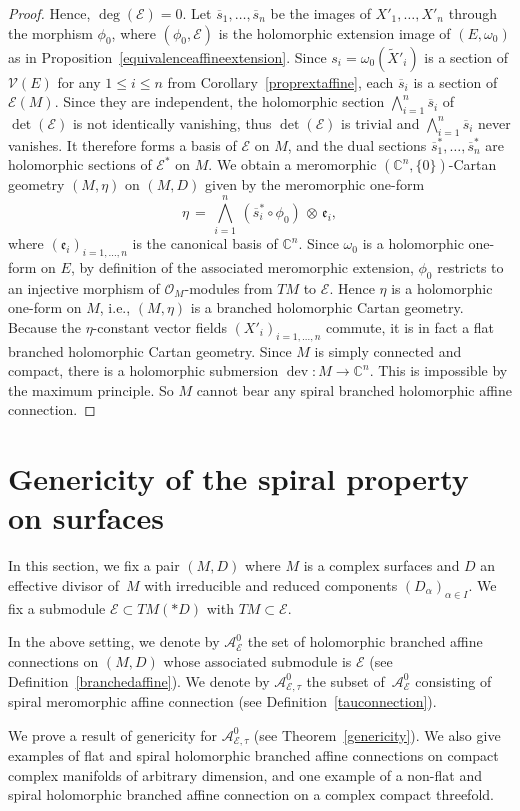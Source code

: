 \documentclass[pdftex]{sigma}
\numberwithin{equation}{section}
\begin{document}
\begin{proof}
Hence, $\deg (\mathcal{E})=0$. Let $\overline{s}_1,\dots,\overline{s}_n$ be the images of $X'_1,\dots,X'_n$ through the morphism $\phi_0$, where $(\phi_0,\mathcal{E})$ is the holomorphic extension image of $(E,\omega_0)$ as in Proposition~\ref{equivalenceaffineextension}. Since $s_i=\omega_0(\tilde{X}'_i)$ is a section of $\mathcal{V}(E)$ for any $1\leq i \leq n$ from Corollary~\ref{proprextaffine}, each $\overline{s}_i$ is a section of~$\mathcal{E}(M)$. Since they are independent, the holomorphic section $\bigwedge_{i=1}^{n} \overline{s}_i$ of $\det(\mathcal{E})$ is not identically vanishing, thus $\det(\mathcal{E})$ is trivial and $\bigwedge_{i=1}^{n}\overline{s}_i$ never vanishes. It therefore forms a basis of $\mathcal{E}$ on $M$, and the dual sections $\overline{s}_1^*,\dots,\overline{s}_n^*$ are holomorphic sections of $\mathcal{E}^*$ on $M$. We obtain a meromorphic $(\mathbb{C}^n,\{0\})$-Cartan geometry $(M,\eta)$ on $(M,D)$ given by the meromorphic one-form
\[ \eta \,=\, \bigwedge_{i=1}^{n} \,(\overline{s}_i^* \circ \phi_0)\, \otimes \,\mathfrak{e}_i,\]
 where $(\mathfrak{e}_i)_{i=1,\dots,n}$ is the canonical basis of $\mathbb{C}^n$. Since $\omega_0$ is a holomorphic one-form on $E$, by definition of the associated meromorphic extension, $\phi_0$ restricts to an injective morphism of $\mathcal{O}_M$-modules from $TM$ to $\mathcal{E}$. Hence $\eta$ is a holomorphic one-form on $M$, i.e., $(M,\eta)$ is a branched holomorphic Cartan geometry. Because the $\eta$-constant vector fields $(X'_i)_{i=1,\dots,n}$ commute, it is in fact a flat branched holomorphic Cartan geometry. Since $M$ is simply connected and compact, there is a holomorphic submersion $\operatorname{dev}\colon M \longrightarrow \mathbb{C}^n$. This is impossible by the maximum principle. So $M$ cannot bear any spiral branched holomorphic affine connection.
\end{proof}

\section{Genericity of the spiral property on surfaces}
In this section, we fix a pair $(M,D)$ where $M$ is a complex surfaces and $D$ an effective divisor of~$M$ with irreducible and reduced components $(D_\alpha)_{\alpha\in I}$. We fix a submodule $\mathcal{E} \subset TM(* D)$ with $TM\subset \mathcal{E}$.
\begin{Definition}\label{A0} In the above setting, we denote by $\mathcal{A}^0_{\mathcal{E}}$ the set of holomorphic branched affine connections on $(M,D)$ whose associated submodule is $\mathcal{E}$ (see Definition~\ref{branchedaffine}). We denote by $\mathcal{A}^0_{\mathcal{E},\tau}$ the subset of~$\mathcal{A}^0_{\mathcal{E}}$ consisting of spiral meromorphic affine connection (see Definition~\ref{tauconnection}). \end{Definition} We prove a result of genericity for $\mathcal{A}^0_{\mathcal{E},\tau}$ (see Theorem~\ref{genericity}). We also give examples of flat and spiral holomorphic branched affine connections on compact complex manifolds of arbitrary dimension, and one example of a non-flat and spiral holomorphic branched affine connection on a complex compact threefold.
\end{document}
